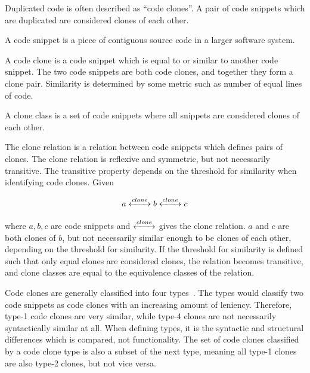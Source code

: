 Duplicated code is often described as ``code clones''. A pair of code snippets which are
duplicated are considered clones of each other.

\begin{definition}
	A code snippet is a piece of contiguous source code in a larger software system.
\end{definition}

\begin{definition}
	A code clone is a code snippet which is equal to or similar to another code snippet. The two
	code snippets are both code clones, and together they form a clone pair.
	Similarity is determined by some metric such as number of equal lines of code.
\end{definition}

\begin{definition}
	A clone class is a set of code snippets where all snippets are considered clones of each
	other.
\end{definition}


The clone relation is a relation between code snippets which defines pairs of clones.
The clone relation is reflexive and symmetric, but not necessarily transitive. The transitive
property depends on the threshold for similarity when identifying code clones. Given

$$a \xleftrightarrow{clone} b \xleftrightarrow{clone} c$$


where $a,b,c$ are code snippets and $\xleftrightarrow{clone}$ gives the clone relation.
$a$ and $c$ are both clones of $b$, but not necessarily similar enough to be clones of
each other, depending on the threshold for similarity. If the threshold for similarity is
defined such that only equal clones are considered clones, the relation becomes
transitive, and clone classes are equal to the equivalence classes of the relation.

Code clones are generally classified into four types~\cite{Inoue_introduction_to_cc}. The
types would classify two code snippets as code clones with an increasing amount of
leniency. Therefore, type-1 code clones are very similar, while type-4 clones are not
necessarily syntactically similar at all. When defining types, it is the syntactic and
structural differences which is compared, not functionality. The set of code clones
classified by a code clone type is also a subset of the next type, meaning all type-1
clones are also type-2 clones, but not vice versa.

